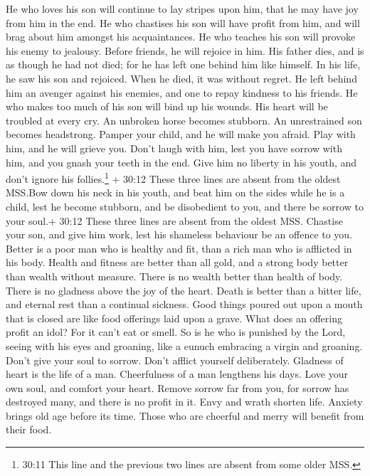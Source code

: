  He who loves his son will continue to lay stripes upon him,
that he may have joy from him in the end.  He who chastises
his son will have profit from him, and will brag about him amongst his
acquaintances.  He who teaches his son will provoke his
enemy to jealousy. Before friends, he will rejoice in him. 
His father dies, and is as though he had not died; for he has left one
behind him like himself.  In his life, he saw his son and
rejoiced. When he died, it was without regret.  He left
behind him an avenger against his enemies, and one to repay kindness to
his friends.  He who makes too much of his son will bind up
his wounds. His heart will be troubled at every cry.  An
unbroken horse becomes stubborn. An unrestrained son becomes headstrong.
 Pamper your child, and he will make you afraid. Play with
him, and he will grieve you.  Don't laugh with him, lest
you have sorrow with him, and you gnash your teeth in the end.
 Give him no liberty in his youth, and don't ignore his
follies.\footnote{30:11 This line and the previous two lines are absent
  from some older MSS.}  + 30:12 These three lines are
absent from the oldest MSS.Bow down his neck in his youth, and beat him
on the sides while he is a child, lest he become stubborn, and be
disobedient to you, and there be sorrow to your soul.+ 30:12 These three
lines are absent from the oldest MSS.  Chastise your son,
and give him work, lest his shameless behaviour be an offence to you.
 Better is a poor man who is healthy and fit, than a rich
man who is afflicted in his body.  Health and fitness are
better than all gold, and a strong body better than wealth without
measure.  There is no wealth better than health of body.
There is no gladness above the joy of the heart.  Death is
better than a bitter life, and eternal rest than a continual sickness.
 Good things poured out upon a mouth that is closed are
like food offerings laid upon a grave.  What does an
offering profit an idol? For it can't eat or smell. So is he who is
punished by the Lord,  seeing with his eyes and groaning,
like a eunuch embracing a virgin and groaning.  Don't give
your soul to sorrow. Don't afflict yourself deliberately. 
Gladness of heart is the life of a man. Cheerfulness of a man lengthens
his days.  Love your own soul, and comfort your heart.
Remove sorrow far from you, for sorrow has destroyed many, and there is
no profit in it.  Envy and wrath shorten life. Anxiety
brings old age before its time.  Those who are cheerful and
merry will benefit from their food.

